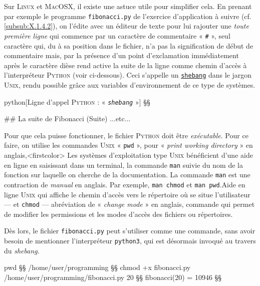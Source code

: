 Sur \textsc{Linux} et \textsc{MacOSX}, il existe une astuce utile pour simplifier cela. En prenant par exemple le programme \texttt{fibonacci.py} de l'exercice d'application à suivre (cf. \cref{subsub:X.1.4.2}), on l'édite avec un éditeur de texte pour lui rajouter une \emph{toute première ligne} qui commence par un caractère de commentaire « \texttt{\#} », seul caractère qui, du à sa position dans le fichier, n'a pas la signification de début de commentaire mais, par la présence d'un point d'exclamation immédiatement après le caractère dièse rend active la suite de la ligne comme chemin d'accès à l'interpréteur \textsc{Python} (voir ci-dessous). Ceci s'appelle un \href{https://en.wikipedia.org/wiki/Shebang_%28Unix%29}{\texttt{shebang}} dans le jargon \textsc{Unix}, rendu possible grâce aux variables d’environnement de ce type de systèmes.

\begin{code}{python}[Ligne d'appel \textsc{Python} : « \textit{\texttt{shebang}} »]
§\pyshebang§

## La suite de Fibonacci (Suite)
...etc...
\end{code}

\pagebreak

Pour que cela puisse fonctionner, le fichier \textsc{Python} doit être \emph{exécutable}. 
Pour ce faire, on utilise les commandes \textsc{Unix} « \texttt{pwd} », pour « \textit{print working directory} » en anglais,\caution[c]<firstcolor>{%
Les systèmes d'exploitation type \textsc{Unix} bénéficient d'une aide en ligne en saisissant dans un terminal, la commande \texttt{man} suivie du nom de la fonction sur laquelle on cherche de la documentation. La commande \texttt{man} est une contraction de \textit{manual} en anglais. Par exemple, \texttt{man chmod} et \texttt{man pwd}.}{Aide en ligne \textsc{Unix}}
qui affiche le chemin d'accès vers le répertoire où se situe l'utilisateur --- et \texttt{chmod} --- abréviation de « \textit{change mode} » en anglais, commande qui permet de modifier les permissions et les modes d'accès des fichiers ou répertoires. 

Dès lors, le fichier \texttt{fibonacci.py} peut s'utiliser comme une commande, sans avoir besoin de mentionner l'interpréteur \texttt{python3}, qui est désormais invoqué au travers du \textit{shebang}.
\vspace*{4pt}
\begin{ubuntu}
pwd §\startconsole§
/home/user/programming §§
chmod +x fibonacci.py
/home/user/programming/fibonacci.py 20 §\startconsole§
fibonacci(20) = 10946 §§
\end{ubuntu}
\vspace*{4pt}

